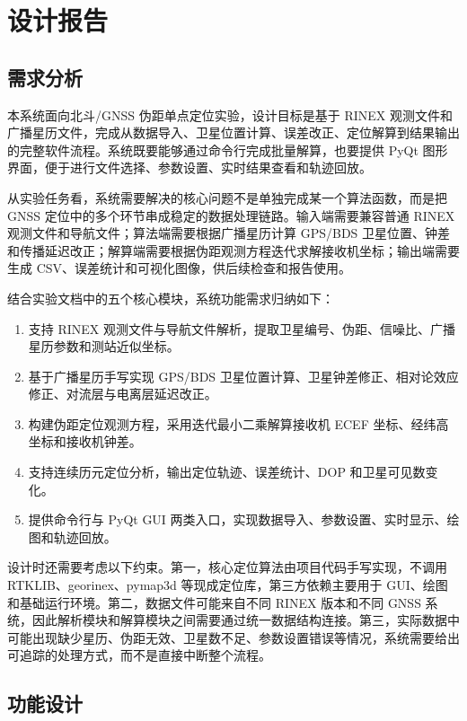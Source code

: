 \section{设计报告}

\subsection{需求分析}

本系统面向北斗/GNSS 伪距单点定位实验，设计目标是基于 RINEX 观测文件和广播星历文件，完成从数据导入、卫星位置计算、误差改正、定位解算到结果输出的完整软件流程。系统既要能够通过命令行完成批量解算，也要提供 PyQt 图形界面，便于进行文件选择、参数设置、实时结果查看和轨迹回放。

从实验任务看，系统需要解决的核心问题不是单独完成某一个算法函数，而是把 GNSS 定位中的多个环节串成稳定的数据处理链路。输入端需要兼容普通 RINEX 观测文件和导航文件；算法端需要根据广播星历计算 GPS/BDS 卫星位置、钟差和传播延迟改正；解算端需要根据伪距观测方程迭代求解接收机坐标；输出端需要生成 CSV、误差统计和可视化图像，供后续检查和报告使用。

结合实验文档中的五个核心模块，系统功能需求归纳如下：

\begin{enumerate}
\item 支持 RINEX 观测文件与导航文件解析，提取卫星编号、伪距、信噪比、广播星历参数和测站近似坐标。
\item 基于广播星历手写实现 GPS/BDS 卫星位置计算、卫星钟差修正、相对论效应修正、对流层与电离层延迟改正。
\item 构建伪距定位观测方程，采用迭代最小二乘解算接收机 ECEF 坐标、经纬高坐标和接收机钟差。
\item 支持连续历元定位分析，输出定位轨迹、误差统计、DOP 和卫星可见数变化。
\item 提供命令行与 PyQt GUI 两类入口，实现数据导入、参数设置、实时显示、绘图和轨迹回放。
\end{enumerate}

设计时还需要考虑以下约束。第一，核心定位算法由项目代码手写实现，不调用 RTKLIB、georinex、pymap3d 等现成定位库，第三方依赖主要用于 GUI、绘图和基础运行环境。第二，数据文件可能来自不同 RINEX 版本和不同 GNSS 系统，因此解析模块和解算模块之间需要通过统一数据结构连接。第三，实际数据中可能出现缺少星历、伪距无效、卫星数不足、参数设置错误等情况，系统需要给出可追踪的处理方式，而不是直接中断整个流程。

\subsection{功能设计}

